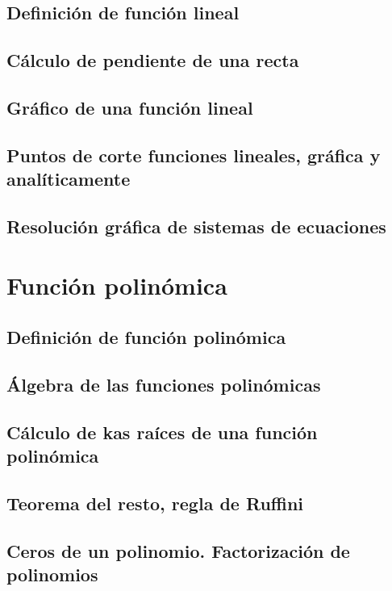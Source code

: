 \subsection{Definición de función lineal}

\subsection{Cálculo de pendiente de una recta}

\subsection{Gráfico de una función lineal}

\subsection{Puntos de corte funciones lineales, gráfica y analíticamente}

\subsection{Resolución gráfica de sistemas de ecuaciones}

\section{Función polinómica}

\subsection{Definición de función polinómica}

\subsection{Álgebra de las funciones polinómicas}

\subsection{Cálculo de kas raíces de una función polinómica}

\subsection{Teorema del resto, regla de Ruffini}

\subsection{Ceros de un polinomio. Factorización de polinomios}

